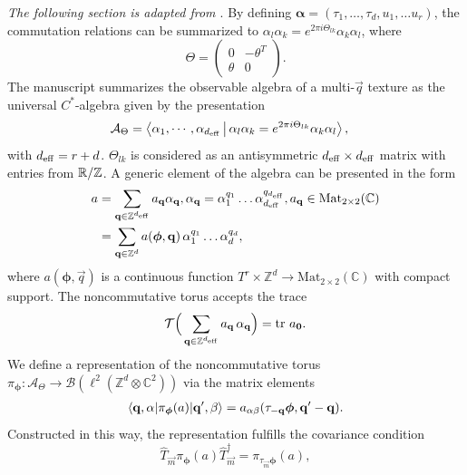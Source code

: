 \documentclass[
    10pt,
    aps,
    prb,
	longbibliography,
    twocolumn,
    floatfix,
    superscriptaddress,
]{revtex4-2}
\begin{document}
{\it The following section is adapted from \cite{Liu2022}}. By defining $\boldsymbol{\alpha}=(\tau_1, \ldots, \tau_d, u_1,\ldots u_r )$, the commutation relations can be summarized to $\alpha_l \alpha_k = e^{2 \pi i \Theta_{lk}} \alpha_k  \alpha_l$, where
\begin{equation}
    \Theta = \begin{pmatrix}
    0 & -\theta^T \\
    \theta & 0
    \end{pmatrix} .
\end{equation}
The manuscript summarizes the observable algebra of a multi-$\vec{q}$ texture as the universal $C^\ast$-algebra given by the presentation
\begin{align}
    \mathcal{A}_\Theta &= \Braket{ \alpha_1, \cdots, \alpha_{{d_\mathrm{eff}}}
    |  \alpha_l \alpha_k = e^{ 2 \pi i \Theta_{lk}} \alpha_k  \alpha_l },
\end{align}
with ${d_\mathrm{eff}} = r+ d$.
$ \Theta_{lk}$ is considered as an antisymmetric  ${d_\mathrm{eff}}\times {d_\mathrm{eff}}$  matrix with entries from ${\mathbb R}/{\mathbb Z}$.
A generic element of the algebra can be presented in the form
\begin{align}
a & = \sum_{\mathbf{q} \in {\mathbb Z}^{{d_\mathrm{eff}}}} a_{\mathbf{q}}
 \alpha_{\mathbf{q}},  \alpha_{\mathbf{q}} =\alpha_1^{q_1} \ldots\alpha_{d_\mathrm{eff}}^{q_{d_\mathrm{eff}}},  a_{\mathbf{q}} \in \mathrm{Mat}_{2\times2} (\mathbb{C})
\notag \\
& = 	\sum_{\mathbf{q} \in {\mathbb Z}^{d}} a( \boldsymbol{\phi}, \mathbf{q}) 
\, 
\alpha_1^{q_1} \ldots\alpha_d^{q_d},
\end{align}
where $ a(\boldsymbol{\phi},\vec{q}) $  is a continuous function $T^r \times \mathbb{Z}^d \to \mathrm{Mat}_{2\times 2}(\mathbb{C})$ with compact support.
The noncommutative torus accepts the trace
\begin{equation}
	\mathcal{T} \Big(
		\sum_{\mathbf{q} \in {\mathbb Z}^{{d_\mathrm{eff}}}} a_{\mathbf{q}}
\, \alpha_{\mathbf{q}}
	\Big)
	= \mathrm{tr}~ a_{\mathbf{0}} .
\end{equation}
We define a representation of the noncommutative torus $\pi_{\boldsymbol{\phi}} \colon \mathcal{A}_\Theta \to \mathcal{B}(\ell^2(\mathbb{Z}^d \otimes \mathbb{C}^2))$ via the matrix elements
\begin{align}
	\braket{\mathbf{q}, \alpha
	|
	\pi_{\boldsymbol{\phi}} (a)
	| \mathbf{q}', \beta
	}
	=
	a_{\alpha \beta} ( \tau_{-\mathbf{q}} \boldsymbol{\phi}, \mathbf{q}'-\mathbf{q}) .
\end{align}
Constructed in this way, the representation fulfills the covariance condition
\begin{equation}
	\hat{T}_{\vec{m}}
	\pi_{\boldsymbol{\phi}} (a)
	\hat{T}_{\vec{m}}^\dagger
	= \pi_{\tau_{\vec{m}}\boldsymbol{\phi}} (a) ,
\end{equation}
\end{document}
